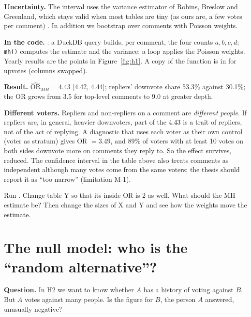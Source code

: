

\textbf{Uncertainty.} The interval uses the variance estimator of Robins, Breslow and Greenland, which stays valid when most tables are tiny (as ours are, a few votes per comment) . In addition we bootstrap over comments with Poisson weights.

\textbf{In the code.} : a DuckDB query builds, per comment, the four counts $a,b,c,d$; \texttt{mh()} computes the estimate and the variance; a loop applies the Poisson weights. Yearly results are the points in Figure~\ref{fig:h1}. A copy of the function is in  for upvotes (columns swapped).

\textbf{Result.} $\widehat{\mathrm{OR}}_{MH}=4.43$ [4.42, 4.44]; repliers' downvote share 53.3\% against 30.1\%; the OR grows from 3.5 for top-level comments to 9.0 at greater depth.

\begin{pitfall}
\textbf{Different voters.} Repliers and non-repliers on a comment are \emph{different people}. If repliers are, in general, heavier downvoters, part of the 4.43 is a trait of repliers, not of the act of replying. A diagnostic that uses each voter as their own control (voter as stratum) gives OR $=3.49$, and 89\% of voters with at least 10 votes on both sides downvote more on comments they reply to. So the effect survives, reduced. The confidence interval in the table above also treats comments as independent although many votes come from the same voters; the thesis should report it as ``too narrow'' (limitation M-1).
\end{pitfall}

\begin{tryit}
Run . Change table Y so that its inside OR is 2 as well. What should the MH estimate be? Then change the sizes of X and Y and see how the weights move the estimate.
\end{tryit}

\section{The null model: who is the ``random alternative''?}\label{sec:null}

\textbf{Question.} In H2 we want to know whether $A$ has a history of voting against $B$. But $A$ votes against many people. Is the figure for $B$, the person $A$ answered, unusually negative?

